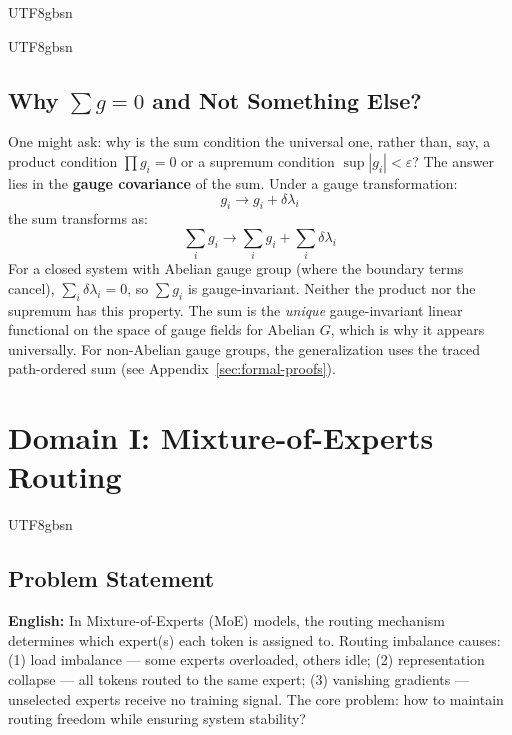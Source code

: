 \documentclass[11pt,a4paper]{article}
\begin{document}
\begin{CJK}{UTF8}{gbsn}
{\begin{CJK}{UTF8}{gbsn}
\subsection{Why $\sum g = 0$ and Not Something Else?}
One might ask: why is the sum condition the universal one, rather than, say, a product
condition $\prod g_i = 0$ or a supremum condition $\sup |g_i| < \varepsilon$?
The answer lies in the \textbf{gauge covariance} of the sum. Under a gauge transformation:
\begin{equation}
    g_i \to g_i + \delta\lambda_i
\end{equation}
the sum transforms as:
\begin{equation}
    \sum_i g_i \to \sum_i g_i + \sum_i \delta\lambda_i
\end{equation}
For a closed system with Abelian gauge group (where the boundary terms cancel),
$\sum_i \delta\lambda_i = 0$, so $\sum g_i$ is gauge-invariant. Neither the
product nor the supremum has this property. The sum is the \textit{unique}
gauge-invariant linear functional on the space of gauge fields for Abelian $G$,
which is why it appears universally. For non-Abelian gauge groups, the
generalization uses the traced path-ordered sum (see Appendix~\ref{sec:formal-proofs}).
\end{CJK}
\section{Domain I: Mixture-of-Experts Routing}
\label{sec:moe}
\begin{CJK}{UTF8}{gbsn}
\subsection{Problem Statement}
\noindent
\vspace{0.3cm}
\noindent
\textbf{English:} In Mixture-of-Experts (MoE) models, the routing mechanism determines
which expert(s) each token is assigned to. Routing imbalance causes: (1) load imbalance
--- some experts overloaded, others idle; (2) representation collapse --- all tokens
routed to the same expert; (3) vanishing gradients --- unselected experts receive
no training signal. The core problem: how to maintain routing freedom while ensuring
system stability?

\end{CJK}}
\end{CJK}
\end{document}
